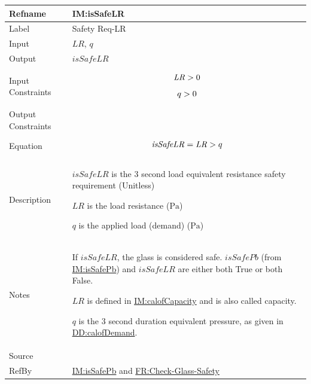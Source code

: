 \documentclass[12pt]{article}
\newcommand{\gt}{\ensuremath >}
\begin{document}
\medskip
\noindent
\begin{minipage}{\textwidth}
\begin{tabular}{>{\raggedright}p{}>{\raggedright\arraybackslash}p{}}
\toprule \textbf{Refname} & \textbf{IM:isSafeLR}
\label{IM:isSafeLR}
\\ \midrule
Label & Safety Req-LR
        
\\ \midrule
Input & $\mathit{LR}$, $q$
        
\\ \midrule
Output & $\mathit{isSafeLR}$
         
\\ \midrule
Input Constraints & \begin{displaymath}
                    \mathit{LR}\gt{}0
                    \end{displaymath}
                    \begin{displaymath}
                    q\gt{}0
                    \end{displaymath}
\\ \midrule
Output Constraints & 
\\ \midrule
Equation & \begin{displaymath}
           \mathit{isSafeLR}=\mathit{LR}\gt{}q
           \end{displaymath}
\\ \midrule
Description & \begin{symbDescription}
              \item{$\mathit{isSafeLR}$ is the 3 second load equivalent resistance safety requirement (Unitless)}
              \item{$\mathit{LR}$ is the load resistance (${\text{Pa}}$)}
              \item{$q$ is the applied load (demand) (${\text{Pa}}$)}
              \end{symbDescription}
\\ \midrule
Notes & If $\mathit{isSafeLR}$, the glass is considered safe. $\mathit{isSafePb}$ (from \hyperref[IM:isSafePb]{IM:isSafePb}) and $\mathit{isSafeLR}$ are either both True or both False.
        
        $\mathit{LR}$ is defined in \hyperref[IM:calofCapacity]{IM:calofCapacity} and is also called capacity.
        
        $q$ is the 3 second duration equivalent pressure, as given in \hyperref[DD:calofDemand]{DD:calofDemand}.
        
\\ \midrule
Source & \cite{astm2009}
         
\\ \midrule
RefBy & \hyperref[IM:isSafePb]{IM:isSafePb} and \hyperref[checkGlassSafety]{FR:Check-Glass-Safety}
        
\\ \bottomrule
\end{tabular}
\end{minipage}
\end{document}
